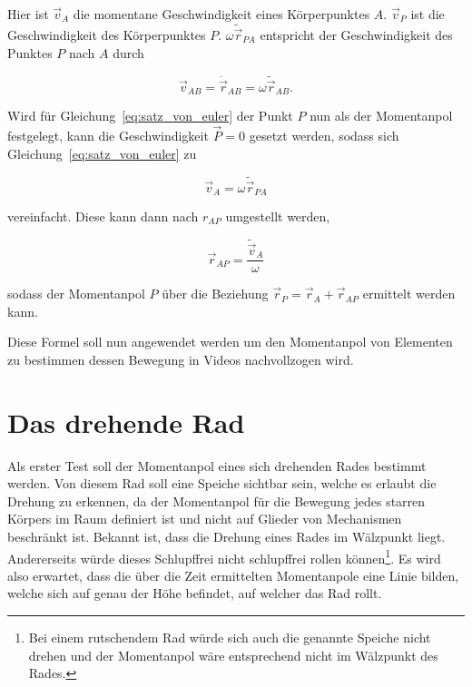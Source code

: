 Hier ist $\vec{v}_A$ die momentane Geschwindigkeit eines Körperpunktes $A$.
$\vec{v}_P$ ist die Geschwindigkeit des Körperpunktes $P$.
$\omega\tilde{\vec{r}}_{PA}$ entspricht der Geschwindigkeit des Punktes $P$ nach $A$ durch %

\begin{equation}
    \vec{v}_{AB} = \dot{\vec{r}}_{AB} = \omega \tilde{\vec{r}}_{AB}.
    \label{eq:absolut_zu_winkel}
\end{equation}

Wird für Gleichung~\ref{eq:satz_von_euler} der Punkt $P$ nun als der Momentanpol festgelegt, kann die Geschwindigkeit $\vec{P} = 0$ gesetzt werden,
sodass sich Gleichung~\ref{eq:satz_von_euler} zu

\begin{equation}
    \vec{v}_A = \omega \tilde{\vec{r}}_{PA}
    \label{eq:satz_von_euler_momentanpol}
\end{equation}

vereinfacht. 
Diese kann dann nach $r_{AP}$ umgestellt werden,

\begin{equation}
    \vec{r}_{AP} = \frac{\tilde{\vec{v}}_A}{\omega}
    \label{eq:euler_rAP}
\end{equation}

sodass der Momentanpol $P$ über die Beziehung $\vec{r}_P = \vec{r}_A + \vec{r}_{AP}$ ermittelt werden kann.

Diese Formel soll nun angewendet werden um den Momentanpol von Elementen zu bestimmen dessen Bewegung in Videos nachvollzogen wird.

\section{Das drehende Rad}\label{ch:drehendesRad}

Als erster Test soll der Momentanpol eines sich drehenden Rades bestimmt werden.
Von diesem Rad soll eine Speiche sichtbar sein, welche es erlaubt die Drehung zu erkennen, da der Momentanpol für die Bewegung jedes starren Körpers im Raum definiert ist und nicht auf Glieder von Mechanismen beschränkt ist.
Bekannt ist, dass die Drehung eines Rades im Wälzpunkt liegt.
Andererseits würde dieses Schlupffrei nicht schlupffrei rollen können\footnote{Bei einem rutschendem Rad würde sich auch die genannte Speiche nicht drehen und der Momentanpol wäre entsprechend nicht im Wälzpunkt des Rades.}.
Es wird also erwartet, dass die über die Zeit ermittelten Momentanpole eine Linie bilden, welche sich auf genau der Höhe befindet, auf welcher das Rad rollt.

